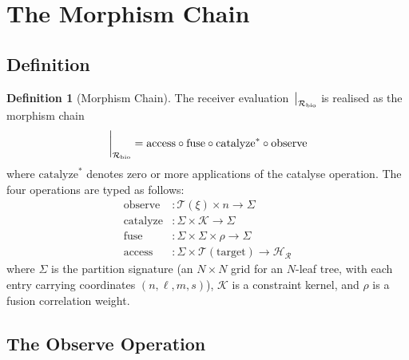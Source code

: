 \documentclass[11pt,twocolumn,a4paper]{article}
\theoremstyle{definition}
\newtheorem{definition}[theorem]{Definition}
\theoremstyle{remark}
\newcommand{\Hilbert}{\mathcal{H}}
\newcommand{\Recv}{\mathcal{R}}
\newcommand{\Sexp}{\xi}
\newcommand{\catalyst}{\mathcal{K}}
\newcommand{\Sig}{\Sigma}
\newcommand{\Tree}{\mathcal{T}}
\begin{document}
\section{The Morphism Chain}
\label{sec:morphism_chain}

\subsection{Definition}

\begin{definition}[Morphism Chain]
\label{def:morphism_chain}
The receiver evaluation $\eval_{\Recv_{\mathrm{bio}}}$ is realised as the morphism chain
\begin{equation}
\eval_{\Recv_{\mathrm{bio}}} = \mathrm{access} \circ \mathrm{fuse} \circ \mathrm{catalyze}^* \circ \mathrm{observe}
\label{eq:morphism_chain}
\end{equation}
where $\mathrm{catalyze}^*$ denotes zero or more applications of the catalyse operation. The four operations are typed as follows:
\begin{align}
\mathrm{observe} &: \Tree(\Sexp) \times n \to \Sig \\
\mathrm{catalyze} &: \Sig \times \catalyst \to \Sig \\
\mathrm{fuse} &: \Sig \times \Sig \times \rho \to \Sig \\
\mathrm{access} &: \Sig \times \Tree(\mathrm{target}) \to \Hilbert_\Recv
\end{align}
where $\Sig$ is the partition signature (an $N \times N$ grid for an $N$-leaf tree, with each entry carrying coordinates $(n, \ell, m, s)$), $\catalyst$ is a constraint kernel, and $\rho$ is a fusion correlation weight.
\end{definition}

\subsection{The Observe Operation}
\end{document}
